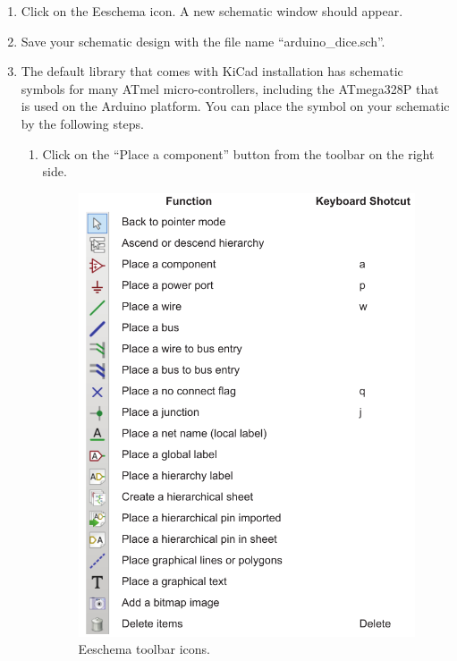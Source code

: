 \documentclass[12pt,letterpaper]{scrartcl}
\begin{document}
\begin{enumerate}
	\item Click on the Eeschema icon. A new schematic window should appear.
	\item Save your schematic design with the file name ``arduino\_dice.sch''. 
	\item The default library that comes with KiCad installation has schematic symbols for many ATmel micro-controllers, including the ATmega328P that is used on the Arduino platform. You can place the symbol on your schematic by the following steps. 
		\begin{enumerate}
			\item Click on the ``Place a component'' button from the toolbar on the right side.
			
				\begin{figure}[h]
					\centering
					\includegraphics{eeschema-toolbar}
					\caption{Eeschema toolbar icons.}
					\label{fig:eeschema-toolbar}
				\end{figure}
				

\end{enumerate}
\end{enumerate}
\end{document}
